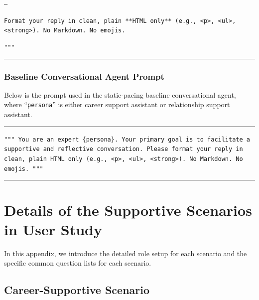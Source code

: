 \texttt{---}

\texttt{Format your reply in clean, plain **HTML only** (e.g., <p>, <ul>, <strong>). No Markdown. No emojis.}

\texttt{"""}

\noindent\rule{\linewidth}{0.2pt}



\subsubsection{Baseline Conversational Agent Prompt}
\label{appx:baseline_prompt}
Below is the prompt used in the static-pacing baseline conversational agent, where ``\texttt{persona}'' is either career support assistant or relationship support assistant.

\noindent\rule{\linewidth}{0.2pt}

\texttt{"""
You are an expert \textcolor{ccolor}{\{persona\}}. Your primary goal is to facilitate a supportive and reflective conversation.
Please format your reply in clean, plain HTML only (e.g., <p>, <ul>, <strong>). No Markdown. No emojis.
"""}

\noindent\rule{\linewidth}{0.2pt}

\section{Details of the Supportive Scenarios in User Study}
\label{appx:scenarios}
In this appendix, we introduce the detailed role setup for each scenario and the specific common question lists for each scenario.

\subsection{Career-Supportive Scenario}

